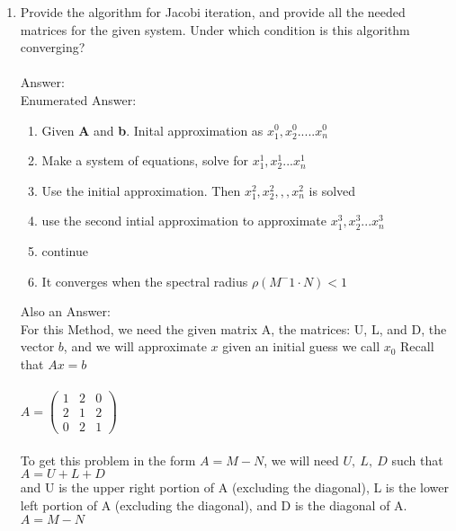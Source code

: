 \documentclass{article}
\begin{document}
\begin{enumerate}
\begin{enumerate}
        \item Provide the algorithm for Jacobi iteration, and provide all the needed matrices for the given system. Under which condition is this algorithm converging?\\
        \\
        \color{red}
            Answer:\\
            Enumerated Answer:
            \begin{enumerate}
                \item Given \textbf{A} and \textbf{b}. Inital approximation as $x_1^0,x_2^0.....x_n^0$
                \item Make a system of equations, solve for $x_1^1,x_2^1...x_n^1$
                \item Use the initial approximation. Then $x_1^2,x_2^2,,,x_n^2$ is solved
                \item use the second intial approximation to approximate $x_1^3,x_2^3...x_n^3$
                \item continue
                \item It converges when the spectral radius $\rho(M^-1\cdot N) < 1$
            \end{enumerate}
            Also an Answer:\\
            For this Method, we need the given matrix A, the matrices: U, L, and D, the vector $b$, and we will approximate $x$ given an initial guess we call $x_0$
            Recall that $Ax = b$\\
            \\
            $A= \begin{pmatrix} 1 & 2 & 0\\ 2 & 1 & 2\\ 0 & 2 & 1 \end{pmatrix}$\\
            \\
            To get this problem in the form $ A = M - N  $, we will need $U,\:L,\:D$ such that $A = U + L + D$\\
            and U is the upper right portion of A (excluding the diagonal), L is the lower left portion of A (excluding the diagonal), and D is the diagonal of A.
            $ A = M - N $\\
            \\

\end{enumerate}
\end{enumerate}
\end{document}
